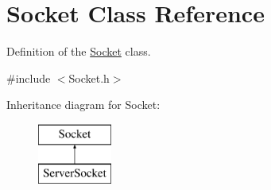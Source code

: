 \hypertarget{classSocket}{\section{Socket Class Reference}
\label{classSocket}
}


Definition of the \hyperlink{classSocket}{Socket} class.  




{\ttfamily \#include $<$Socket.\-h$>$}

Inheritance diagram for Socket\-:\begin{figure}[H]
\begin{center}
\leavevmode
\includegraphics[height=2.000000cm]{classSocket}
\end{center}
\end{figure}
